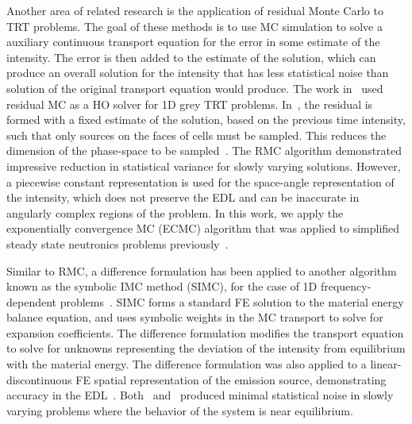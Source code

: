 Another area of related research is the application of
residual Monte Carlo to TRT problems.  The goal of these methods is to use MC simulation
to solve a auxiliary continuous transport equation for the error in some estimate of the intensity.  The error is then added to the
estimate of the solution, which can produce an overall solution for the intensity that has
less statistical noise than solution of the original transport equation would produce.
The work in~\cite{rmc} used residual MC as a HO solver for 1D grey TRT problems.
In~\cite{rmc}, the residual is formed with a fixed estimate of the solution, based
on the previous time intensity, such that only
sources on the faces of cells must be sampled. This reduces the dimension of the
phase-space to be sampled~\cite{rmc}. The RMC algorithm demonstrated impressive reduction
in statistical variance for slowly varying solutions.  However, a
piecewise constant representation is used for the space-angle representation of the
intensity, which does not preserve the EDL and can be inaccurate in angularly complex
regions of the problem.  In this work, we apply the exponentially convergence MC (ECMC)
algorithm that was applied to
simplified steady state neutronics problems previously~\cite{jake}.

Similar to RMC, a difference formulation has been applied to another algorithm known as the symbolic IMC method
(SIMC), for the case of 1D frequency-dependent problems~\cite{simc_const}.  SIMC forms a
standard FE solution to the material energy balance equation, and uses symbolic
weights in the MC transport to solve for expansion coefficients.  The difference
formulation modifies the transport equation to solve for unknowns representing the
deviation of the intensity from
equilibrium with the material energy.  The difference
formulation was also applied to a linear-discontinuous FE spatial
representation of the emission source, demonstrating accuracy in the EDL~\cite{simc}. 
Both~\cite{simc_const} and~\cite{rmc} produced minimal
statistical noise in slowly varying problems where the behavior of the system is near
equilibrium. 
